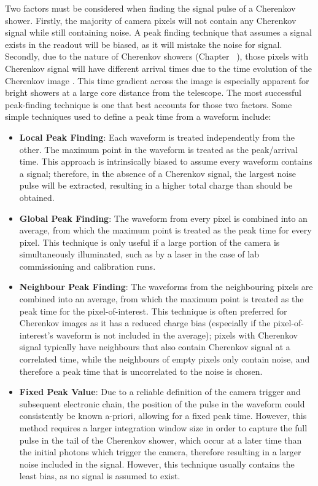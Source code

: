 Two factors must be considered when finding the signal pulse of a Cherenkov shower. Firstly, the majority of camera pixels will not contain any Cherenkov signal while still containing noise. A peak finding technique that assumes a signal exists in the readout will be biased, as it will mistake the noise for signal. Secondly, due to the nature of Cherenkov showers (Chapter~ ), those pixels with Cherenkov signal will have different arrival times due to the time evolution of the Cherenkov image . This time gradient across the image is especially apparent for bright showers at a large core distance from the telescope. The most successful peak-finding technique is one that best accounts for those two factors. Some simple techniques used to define a peak time from a waveform include:
\begin{itemize}
	\item \textbf{Local Peak Finding}: Each waveform is treated independently from the other. The maximum point in the waveform is treated as the peak/arrival time. This approach is intrinsically biased to assume every waveform contains a signal; therefore, in the absence of a Cherenkov signal, the largest noise pulse will be extracted, resulting in a higher total charge than should be obtained.
	\item \textbf{Global Peak Finding}: The waveform from every pixel is combined into an average, from which the maximum point is treated as the peak time for every pixel. This technique is only useful if a large portion of the camera is simultaneously illuminated, such as by a laser in the case of lab commissioning and calibration runs.
	\item \textbf{Neighbour Peak Finding}: The waveforms from the neighbouring pixels are combined into an average, from which the maximum point is treated as the peak time for the pixel-of-interest. This technique is often preferred for Cherenkov images as it has a reduced charge bias (especially if the pixel-of-interest's waveform is not included in the average); pixels with Cherenkov signal typically have neighbours that also contain Cherenkov signal at a correlated time, while the neighbours of empty pixels only contain noise, and therefore a peak time that is uncorrelated to the noise is chosen.
	\item \textbf{Fixed Peak Value}: Due to a reliable definition of the camera trigger and subsequent electronic chain, the position of the pulse in the waveform could consistently be known a-priori, allowing for a fixed peak time. However, this method requires a larger integration window size in order to capture the full pulse in the tail of the Cherenkov shower, which occur at a later time than the initial photons which trigger the camera, therefore resulting in a larger noise included in the signal. However, this technique usually contains the least bias, as no signal is assumed to exist.
\end{itemize}

